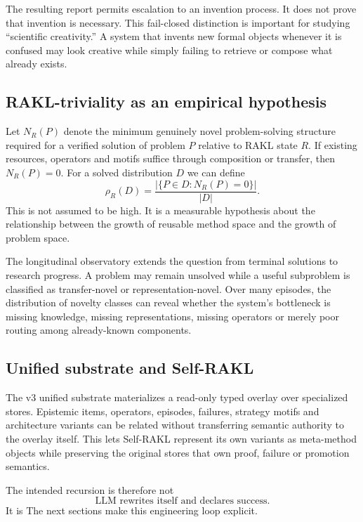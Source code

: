 The resulting report permits escalation to an invention process. It does not prove that invention is necessary. This fail-closed distinction is important for studying ``scientific creativity.'' A system that invents new formal objects whenever it is confused may look creative while simply failing to retrieve or compose what already exists.

\subsection{RAKL-triviality as an empirical hypothesis}

Let $N_R(P)$ denote the minimum genuinely novel problem-solving structure required for a verified solution of problem $P$ relative to RAKL state $R$. If existing resources, operators and motifs suffice through composition or transfer, then $N_R(P)=0$. For a solved distribution $D$ we can define
\[
\rho_R(D)=\frac{|\{P\in D:N_R(P)=0\}|}{|D|}.
\]
This is not assumed to be high. It is a measurable hypothesis about the relationship between the growth of reusable method space and the growth of problem space.

The longitudinal observatory extends the question from terminal solutions to research progress. A problem may remain unsolved while a useful subproblem is classified as transfer-novel or representation-novel. Over many episodes, the distribution of novelty classes can reveal whether the system's bottleneck is missing knowledge, missing representations, missing operators or merely poor routing among already-known components.

\subsection{Unified substrate and Self-RAKL}

The v3 unified substrate materializes a read-only typed overlay over specialized stores. Epistemic items, operators, episodes, failures, strategy motifs and architecture variants can be related without transferring semantic authority to the overlay itself. This lets Self-RAKL represent its own variants as meta-method objects while preserving the original stores that own proof, failure or promotion semantics.

The intended recursion is therefore not
\[
\text{LLM rewrites itself and declares success}.
\]
It is
The next sections make this engineering loop explicit.
